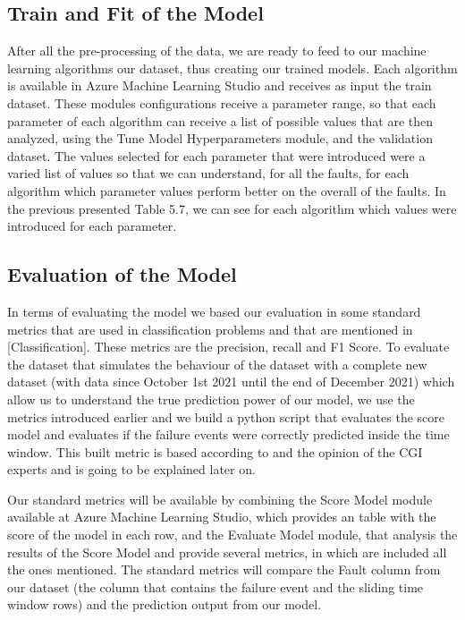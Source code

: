 

\subsection{Train and Fit of the Model}
After all the pre-processing of the data, we are ready to feed to our machine learning algorithms our dataset, thus creating our trained models. Each algorithm is available in Azure Machine Learning Studio and receives as input the train dataset. These modules configurations receive a parameter range, so that each parameter of each algorithm can receive a list of possible values that are then analyzed, using the Tune Model Hyperparameters module, and the validation dataset. 
The values selected for each parameter that were introduced were a varied list of values so that we can understand, for all the faults, for each algorithm which parameter values perform better on the overall of the faults.
In the previous presented Table 5.7, we can see for each algorithm which values were introduced for each parameter.

\subsection{Evaluation of the Model}
In terms of evaluating the model we based our evaluation in some standard metrics that are used in classification problems and that are mentioned in \cite{41_WIND} \cite{N_4_WIND} \cite{MED_1} [Classification]. These metrics are the precision, recall and F1 Score.
To evaluate the dataset that simulates the behaviour of the dataset with a complete new dataset (with data since October 1st 2021 until the end of December 2021) which allow us to understand the true prediction power of our model, we use the metrics introduced earlier and we build a python script that evaluates the score model and evaluates if the failure events were correctly predicted inside the time window. This built metric is based according to \cite{MED_1} and the opinion of the CGI experts and is going to be explained later on.

Our standard metrics will be available by combining the Score Model module available at Azure Machine Learning Studio, which provides an table with the score of the model in each row, and the Evaluate Model module, that analysis the results of the Score Model and provide several metrics, in which are included all the ones mentioned.
The standard metrics will compare the Fault column from our dataset (the column that contains the failure event and the sliding time window rows) and the prediction output from our model.

